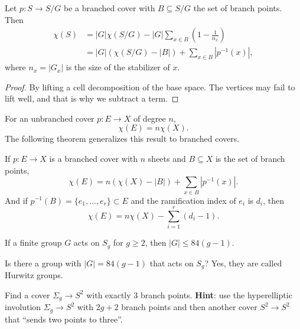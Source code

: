 \begin{theorem}
\label{theorem-riemann-hurwitz}
Let $p:S\to S/G$ be a branched cover
with $B\subseteq S/G$ the set of branch
points. Then
$$
\begin{aligned}
\chi(S)&=|G|\chi(S/G)
-|G|\sum_{x\in B}
\left(1-\frac{1}{n_x}\right)\\
&=|G|(\chi(S/G)-|B|)
+\sum_{x\in B}|p^{-1}(x)|,
\end{aligned}
$$
where $n_x=|G_x|$ is the size of the
stabilizer of $x$.
\end{theorem}

\begin{proof}
By lifting a cell decomposition of the
base space. The vertices may fail to
lift well, and that is why we subtract a
term.
\end{proof}

\begin{remark}
\label{remark-unbranched-euler}
For an unbranched cover $p:E\to X$ of
degree $n$,
$$
\chi(E)=n\chi(X).
$$
The following theorem generalizes this
result to branched covers.
\end{remark}

\begin{theorem}
\label{theorem-riemann-hurwitz-general}
If $p:E\to X$ is a branched cover with
$n$ sheets and $B\subseteq X$ is the set
of branch points,
$$
\chi(E)=n(\chi(X)-|B|)
+\sum_{x\in B}|p^{-1}(x)|.
$$
And if
$p^{-1}(B)=\{e_1,\ldots,e_r\}\subset E$
and the ramification index of $e_i$ is
$d_i$, then
$$
\chi(E)=n\chi(X)-\sum_{i=1}^r(d_i-1).
$$
\end{theorem}

\begin{corollary}
\label{corollary-hurwitz-inequality}
If a finite group $G$ acts on $S_g$ for
$g\geq2$, then $|G|\leq84(g-1)$.
\end{corollary}

\begin{remark}
\label{remark-hurwitz-groups}
Is there a group with $|G|=84(g-1)$
that acts on $S_g$? Yes, they are called
Hurwitz groups.
\end{remark}

\begin{exercise}[Homework]
\label{exercise-three-branch-points}
Find a cover $\Sigma_g\to S^2$ with
exactly $3$ branch points. {\bf Hint}:
use the hyperelliptic involution
$\Sigma_g\to S^2$ with $2g+2$ branch
points and then another cover
$S^2\to S^2$ that ``sends two points to
three''.
\end{exercise}

